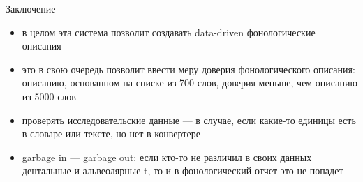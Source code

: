 \documentclass[13pt, t]{beamer}
\begin{document}
\begin{frame}{Заключение}
\begin{itemize}
\item в целом эта система позволит создавать data-driven фонологические описания
\item это в свою очередь позволит ввести меру доверия фонологического описания: описанию, основанном на списке из 700 слов, доверия меньше, чем описанию из 5000 слов
\item проверять исследовательские данные --- в случае, если какие-то единицы есть в словаре или тексте, но нет в конвертере
\item garbage in --- garbage out: если кто-то не различил в своих данных дентальные и альвеолярные t, то и в фонологический отчет это не попадет
\end{itemize}
\end{frame}

\end{document}
